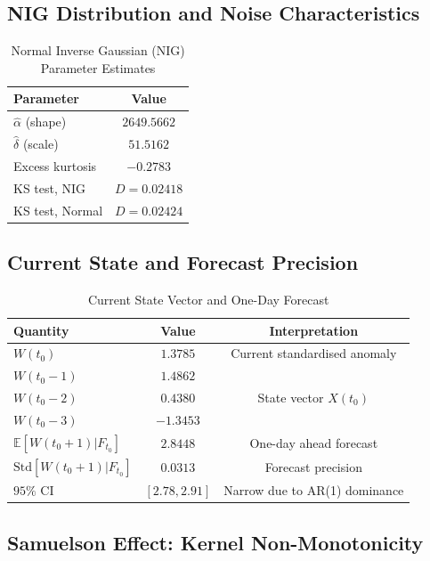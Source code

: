 \documentclass[11pt, a4paper, twoside]{article}
\begin{document}
\subsection*{NIG Distribution and Noise Characteristics}

\begin{table}[ht]
\centering
\caption{Normal Inverse Gaussian (NIG) Parameter Estimates}
\label{tbl:nig_summary}
\small
\begin{tabularx}{0.6\textwidth}{l|c}
\toprule
\textbf{Parameter} & \textbf{Value} \\
\midrule
$\hat{\alpha}$ (shape) & $2649.5662$ \\
$\hat{\delta}$ (scale) & $51.5162$ \\
Excess kurtosis & $-0.2783$ \\
KS test, NIG & $D = 0.02418$ \\
KS test, Normal & $D = 0.02424$ \\
\bottomrule
\end{tabularx}
\end{table}

\subsection*{Current State and Forecast Precision}

\begin{table}[ht]
\centering
\caption{Current State Vector and One-Day Forecast}
\label{tbl:state_forecast}
\small
\begin{tabularx}{0.75\textwidth}{l|c|c}
\toprule
\textbf{Quantity} & \textbf{Value} & \textbf{Interpretation} \\
\midrule
$W(t_0)$ & $1.3785$ & Current standardised anomaly \\
$W(t_0-1)$ & $1.4862$ & \\
$W(t_0-2)$ & $0.4380$ & State vector $X(t_0)$ \\
$W(t_0-3)$ & $-1.3453$ & \\
\midrule
$\mathbb{E}[W(t_0+1)|F_{t_0}]$ & $2.8448$ & One-day ahead forecast \\
$\text{Std}[W(t_0+1)|F_{t_0}]$ & $0.0313$ & Forecast precision \\
$95\%$ CI & $[2.78, 2.91]$ & Narrow due to AR(1) dominance \\
\bottomrule
\end{tabularx}
\end{table}

\subsection*{Samuelson Effect: Kernel Non-Monotonicity}
\end{document}
